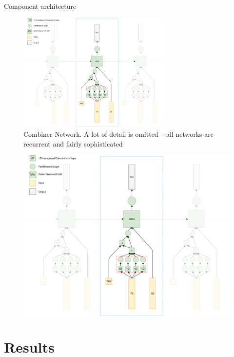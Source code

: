 \documentclass[10pt]{beamer}
\begin{document}
\begin{frame}[fragile]{Component architecture}
\begin{figure}[h]
  \centering
	\includegraphics[width=0.68\textwidth]{figures/combining-network-crop} 
  \caption{Combiner Network. A lot of detail is omitted -- all networks are recurrent and fairly sophisticated}
\label{comb-diag}
\end{figure}
\end{frame}

\begin{frame}[plain]
\begin{figure}[h]
  \centering
	\includegraphics[width=1\textwidth]{figures/combining-network-crop}
\label{comb-diagbig}
\end{figure}
\end{frame}

\section{Results}
\end{document}
